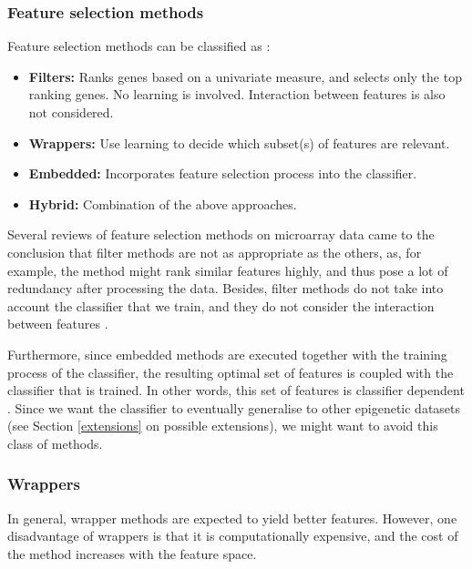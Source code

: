 \documentclass[12pt, twoside, a4paper]{article}
\begin{document}
\subsubsection{Feature selection methods}

Feature selection methods can be classified as \cite{RefWorks:117, RefWorks:118}:
\begin{itemize}
\item \textbf{Filters:} Ranks genes based on a univariate measure, and selects only the top ranking genes. No learning is involved. Interaction between features is also not considered.
\item \textbf{Wrappers:} Use learning to decide which subset(s) of features are relevant.
\item \textbf{Embedded:} Incorporates feature selection process into the classifier.
\item \textbf{Hybrid:} Combination of the above approaches.
\end{itemize}

Several reviews of feature selection methods on microarray data \cite{RefWorks:117, RefWorks:118} came to the conclusion that filter methods are not as appropriate as the others, as, for example, the method might rank similar features highly, and thus pose a lot of redundancy after processing the data. Besides, filter methods do not take into account the classifier that we train, and they do not consider the interaction between features \cite{RefWorks:119}.

Furthermore, since embedded methods are executed together with the training process of the classifier, the resulting optimal set of features is coupled with the classifier that is trained. In other words, this set of features is classifier dependent \cite{RefWorks:118}. Since we want the classifier to eventually generalise to other epigenetic datasets (see Section \ref{extensions} on possible extensions), we might want to avoid this class of methods. 

\subsubsection{Wrappers}
In general, wrapper methods are expected to yield better features. However, one disadvantage of wrappers is that it is computationally expensive, and the cost of the method increases with the feature space.
\end{document}
